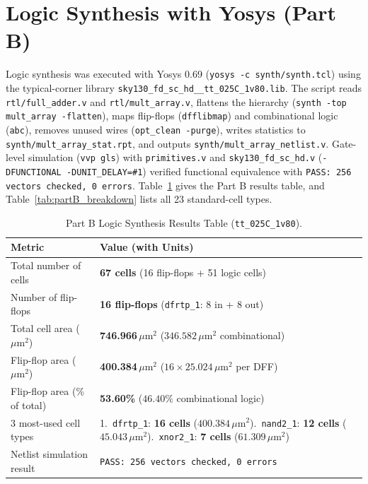 \documentclass[conference,10pt]{IEEEtran}
\begin{document}
\section{Logic Synthesis with Yosys (Part B)}
Logic synthesis was executed with Yosys 0.69 (\texttt{yosys -c synth/synth.tcl}) using the typical-corner library \texttt{sky130\_fd\_sc\_hd\_\_tt\_025C\_1v80.lib}. The script reads \texttt{rtl/full\_adder.v} and \texttt{rtl/mult\_array.v}, flattens the hierarchy (\texttt{synth -top mult\_array -flatten}), maps flip-flops (\texttt{dfflibmap}) and combinational logic (\texttt{abc}), removes unused wires (\texttt{opt\_clean -purge}), writes statistics to \texttt{synth/mult\_array\_stat.rpt}, and outputs \texttt{synth/mult\_array\_netlist.v}. Gate-level simulation (\texttt{vvp gls}) with \texttt{primitives.v} and \texttt{sky130\_fd\_sc\_hd.v} (\texttt{-DFUNCTIONAL -DUNIT\_DELAY=\#1}) verified functional equivalence with \texttt{PASS: 256 vectors checked, 0 errors}. Table~\ref{tab:partB_summary} gives the Part B results table, and Table~\ref{tab:partB_breakdown} lists all 23 standard-cell types.

\begin{table}[!t]
    \centering
    \caption{Part B Logic Synthesis Results Table (\texttt{tt\_025C\_1v80}).}
    \label{tab:partB_summary}
    \footnotesize
    \begin{tabularx}{\columnwidth}{@{}l X@{}}
        \toprule
        \textbf{Metric} & \textbf{Value (with Units)} \\
        \midrule
        Total number of cells & \textbf{67 cells} (16 flip-flops + 51 logic cells) \\
        Number of flip-flops & \textbf{16 flip-flops} (\texttt{dfrtp\_1}: 8 in + 8 out) \\
        Total cell area ($\mu\text{m}^2$) & \textbf{746.966\,$\mu\text{m}^2$} ($346.582\,\mu\text{m}^2$ combinational) \\
        Flip-flop area ($\mu\text{m}^2$) & \textbf{400.384\,$\mu\text{m}^2$} ($16 \times 25.024\,\mu\text{m}^2$ per DFF) \\
        Flip-flop area (\% of total) & \textbf{53.60\%} ($46.40\%$ combinational logic) \\
        3 most-used cell types & 1.~\texttt{dfrtp\_1}: \textbf{16 cells} ($400.384\,\mu\text{m}^2$)\newline
        2.~\texttt{nand2\_1}: \textbf{12 cells} ($45.043\,\mu\text{m}^2$)\newline
        3.~\texttt{xnor2\_1}: \textbf{7 cells} ($61.309\,\mu\text{m}^2$) \\
        Netlist simulation result & \texttt{PASS: 256 vectors checked, 0 errors} \\
        \bottomrule
    \end{tabularx}
\end{table}
\end{document}
